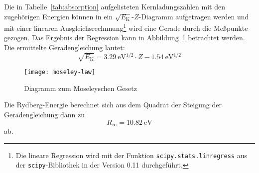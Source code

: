 Die in Tabelle~\ref{tab:absorption} aufgelisteten Kernladungszahlen mit
den zugehörigen Energien können in ein
$\sqrt{E_\mathrm{K}}$-$Z$-Diagramm aufgetragen werden und mit einer
linearen Ausgleichsrechnnung\footnote{Die lineare Regression wird mit
  der Funktion \texttt{scipy.stats.linregress} aus der
  \texttt{scipy}-Bibliothek in der Version 0.11 durchgeführt.} wird eine
Gerade durch die Meßpunkte gezogen. Das Ergebnis der Regression kann in
Abbildung~\ref{fig:moseley} betrachtet werden. Die ermittelte
Geradengleichung lautet:
%
\begin{equation}
  \label{eq:moseley-gerade}
  \sqrt{E_\mathrm{K}} = \SI{3.29}{\electronvolt^{1/2}} \cdot Z
  - \SI{1.54}{\electronvolt^{1/2}}
\end{equation}

\begin{figure}
  \centering
  \texttt{[image: moseley-law]}
  \caption{Diagramm zum Moseleyschen Gesetz}
  \label{fig:moseley}
\end{figure}

Die Rydberg-Energie berechnet sich aus dem Quadrat der Steigung der
Geradengleichung dann zu
%
\begin{equation}
  R_\infty = \SI{10.82}{\electronvolt}
\end{equation}
%
ab.